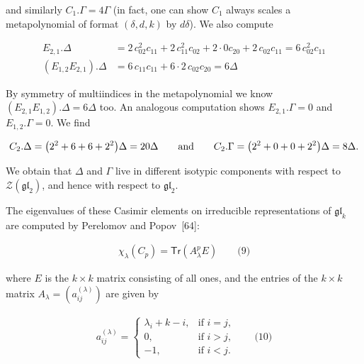 and similarly $C_{1}.\Gamma=4\Gamma$ (in fact, one can show $C_{1}$ always scales a metapolynomial of format $(\delta,d,k)$ by $d\delta$).
We also compute



\[\begin{aligned}
\displaystyle E_{2,1}.\Delta & \displaystyle=2\,c_{02}^{2}c_{11}+2\,c_{11}^{2}c_{02}+2\cdot 0c_{20}+2\,c_{02}c_{11}=6\,c_{02}^{2}c_{11} \\
\displaystyle(E_{1,2}E_{2,1}).\Delta & \displaystyle=6\,c_{11}c_{11}+6\cdot 2\,c_{02}c_{20}=6\Delta
\end{aligned}\]


By symmetry of multiindices in the metapolynomial we know $(E_{2,1}E_{1,2}).\Delta=6\Delta$ too.
An analogous computation shows $E_{2,1}.\Gamma=0$ and $E_{1,2}.\Gamma=0$.
We find



\[\begin{aligned}
\displaystyle C_{2}.\Delta=\big{(}2^{2}+6+6+2^{2}\big{)}\Delta=20\Delta\qquad\text{and}\qquad C_{2}.\Gamma=\big{(}2^{2}+0+0+2^{2}\big{)}\Delta=8\Delta.
\end{aligned}\]


We obtain that $\Delta$ and $\Gamma$ live in different isotypic components with respect to
$\mathcal{Z}(\mathfrak{gl}_{2})$, and hence with respect to $\mathfrak{gl}_{2}$.






The eigenvalues of these Casimir elements on irreducible representations of $\mathfrak{gl}_{k}$ are computed by Perelomov and Popov [64]:



\[\begin{aligned}
\displaystyle\chi_{\lambda}(C_{p})=\mathsf{Tr}(A_{\lambda}^{p}E)\qquad\text{(9)}
\end{aligned}\]


where $E$ is the $k\times k$ matrix consisting of all ones, and the entries of the $k\times k$ matrix $A_{\lambda}=(a^{(\lambda)}_{ij})$ are given by



\[\begin{aligned}
\displaystyle a^{(\lambda)}_{ij}=\begin{cases}\lambda_{i}+k-i,&\text{if $i=j$,}\\ 0,&\text{if $i>j$,}\\ -1,&\text{if $i<j$.}\end{cases}\qquad\text{(10)}
\end{aligned}\]




